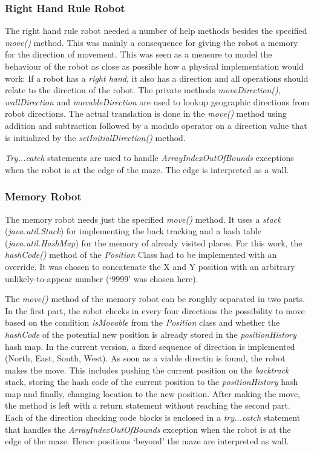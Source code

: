 \documentclass[a4paper,11pt,twoside]{article}
\begin{document}
\subsubsection{Right Hand Rule Robot}
The right hand rule robot needed a number of help methods besides the
specified \textit{move()} method. This was mainly a consequence for
giving the robot a memory for the direction of movement. This was seen
as a measure to model the behaviour of the robot as close as possible
how a physical implementation would work: If a robot has a
\textit{right hand}, it also has a direction and all operations should
relate to the direction of the robot. The private methods
\textit{moveDirection()}, \textit{wallDirection} and
\textit{movableDirection} are used to lookup geographic directions
from robot directions. The actual translation is done in the
\textit{move()} method using addition and subtraction followed by a
modulo operator on a direction value that is initialized by the
\textit{setInitialDirection()} method.

\textit{Try...catch} statements are used to handle
\textit{ArrayIndexOutOfBounds} exceptions when the robot is at the
edge of the maze. The edge is interpreted as a wall. 

\subsubsection{Memory Robot}
The memory robot needs just the specified \textit{move()} method. It
uses a \textit{stack} (\textit{java.util.Stack}) for
implementing the back tracking and a hash table
(\textit{java.util.HashMap}) for the memory of already visited
places. For this work, the \textit{hashCode()} method of the
\textit{Position} Class had to be implemented with an override. It was
chosen to concatenate the X and Y position with an arbitrary
unlikely-to-appear number (`9999' was chosen here).  

The \textit{move()} method of the memory robot can be roughly
separated in two parts. In the first part, the robot checks in every
four directions the possibility to move based on the condition
\textit{isMovable} from the \textit{Position} class and whether the
\textit{hashCode} of the potential new position is already stored in
the \textit{positionHistory} hash map. In the current version, a fixed
sequence of direction is implemented (North, East, South, West). As
soon as a viable directin is found, the robot makes the move. This
includes pushing the current position on the \textit{backtrack} stack,
storing the hash code of the current position to the
\textit{positionHistory} hash map and finally, changing location to
the new position. After making the move, the method is left with a
return statement without reaching the second part. Each of the
direction checking code blocks is enclosed in a \textit{try...catch}
statement that handles the \textit{ArrayIndexOutOfBounds} exception
when the robot is at the edge of the maze. Hence positions `beyond'
the maze are interpreted as wall.
\end{document}
